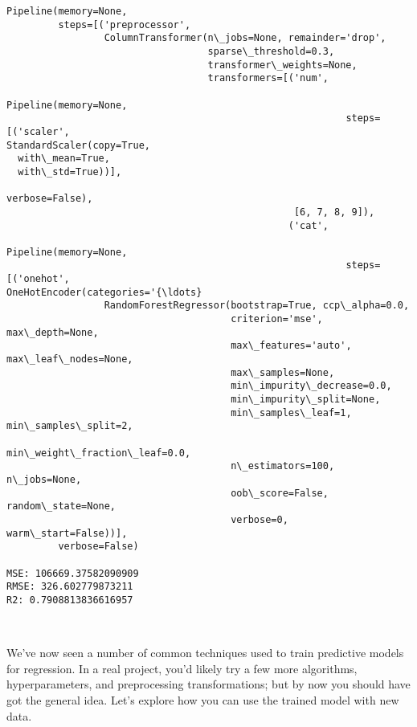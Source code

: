 \documentclass[11pt]{article}
\begin{document}
    \begin{Verbatim}[commandchars=\\\{\}]
Pipeline(memory=None,
         steps=[('preprocessor',
                 ColumnTransformer(n\_jobs=None, remainder='drop',
                                   sparse\_threshold=0.3,
                                   transformer\_weights=None,
                                   transformers=[('num',
                                                  Pipeline(memory=None,
                                                           steps=[('scaler',
StandardScaler(copy=True,
  with\_mean=True,
  with\_std=True))],
                                                           verbose=False),
                                                  [6, 7, 8, 9]),
                                                 ('cat',
                                                  Pipeline(memory=None,
                                                           steps=[('onehot',
OneHotEncoder(categories='{\ldots}
                 RandomForestRegressor(bootstrap=True, ccp\_alpha=0.0,
                                       criterion='mse', max\_depth=None,
                                       max\_features='auto', max\_leaf\_nodes=None,
                                       max\_samples=None,
                                       min\_impurity\_decrease=0.0,
                                       min\_impurity\_split=None,
                                       min\_samples\_leaf=1, min\_samples\_split=2,
                                       min\_weight\_fraction\_leaf=0.0,
                                       n\_estimators=100, n\_jobs=None,
                                       oob\_score=False, random\_state=None,
                                       verbose=0, warm\_start=False))],
         verbose=False)

MSE: 106669.37582090909
RMSE: 326.602779873211
R2: 0.7908813836616957
    \end{Verbatim}

    \begin{center}
    \end{center}
    { \hspace*{\fill} \\}
    
    We've now seen a number of common techniques used to train predictive
models for regression. In a real project, you'd likely try a few more
algorithms, hyperparameters, and preprocessing transformations; but by
now you should have got the general idea. Let's explore how you can use
the trained model with new data.
\end{document}
